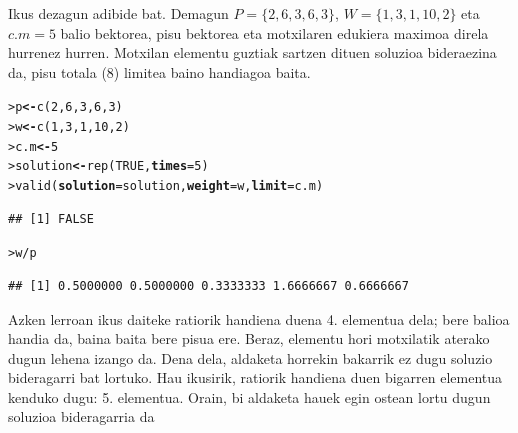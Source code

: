 \documentclass[eu]{ifirak}\usepackage[]{graphicx}\usepackage[]{color}
\makeatletter
\newcommand{\hlnum}[1]{\textcolor[rgb]{0.659,0.4,0.051}{#1}}%
\newcommand{\hlopt}[1]{\textcolor[rgb]{0,0,0}{#1}}%
\newcommand{\hlstd}[1]{\textcolor[rgb]{0,0,0}{#1}}%
\newcommand{\hlkwb}[1]{\textcolor[rgb]{0.549,0.114,0.412}{\textbf{#1}}}%
\newcommand{\hlkwc}[1]{\textcolor[rgb]{0.659,0.573,0.133}{\textbf{#1}}}%
\newcommand{\hlkwd}[1]{\textcolor[rgb]{0.659,0.133,0.482}{#1}}%
\newenvironment{kframe}{%
 \def\at@end@of@kframe{}%
 \ifinner\ifhmode%
  \def\at@end@of@kframe{\end{minipage}}%
  \begin{minipage}{\columnwidth}%
 \fi\fi%
 \def\FrameCommand##1{\hskip\@totalleftmargin \hskip-\fboxsep
 \colorbox{shadecolor}{##1}\hskip-\fboxsep
     \hskip-\linewidth \hskip-\@totalleftmargin \hskip\columnwidth}%
 \MakeFramed {\advance\hsize-\width
   \@totalleftmargin\z@ \linewidth\hsize
   \@setminipage}}%
 {\par\unskip\endMakeFramed%
 \at@end@of@kframe}
\newenvironment{knitrout}{}{} %
\makeatother
\begin{document}
Ikus dezagun adibide bat. Demagun $P=\{2,6,3,6,3\}$, $W=\{1,3,1,10,2\}$ eta $c.m = 5$ balio bektorea, pisu bektorea eta motxilaren edukiera maximoa direla hurrenez hurren. Motxilan elementu guztiak sartzen dituen soluzioa bideraezina da, pisu totala (8) limitea baino handiagoa baita.

\begin{knitrout}
\color{fgcolor}\begin{kframe}
\begin{alltt}
\hlstd{> }\hlstd{p} \hlkwb{<-} \hlkwd{c}\hlstd{(}\hlnum{2}\hlstd{,} \hlnum{6}\hlstd{,} \hlnum{3}\hlstd{,} \hlnum{6}\hlstd{,} \hlnum{3}\hlstd{)}
\hlstd{> }\hlstd{w} \hlkwb{<-} \hlkwd{c}\hlstd{(}\hlnum{1}\hlstd{,} \hlnum{3}\hlstd{,} \hlnum{1}\hlstd{,} \hlnum{10}\hlstd{,} \hlnum{2}\hlstd{)}
\hlstd{> }\hlstd{c.m} \hlkwb{<-} \hlnum{5}
\hlstd{> }\hlstd{solution} \hlkwb{<-} \hlkwd{rep}\hlstd{(}\hlnum{TRUE}\hlstd{,} \hlkwc{times}\hlstd{=}\hlnum{5}\hlstd{)}
\hlstd{> }\hlkwd{valid}\hlstd{(}\hlkwc{solution}\hlstd{=solution,} \hlkwc{weight}\hlstd{=w,} \hlkwc{limit}\hlstd{=c.m)}
\end{alltt}
\begin{verbatim}
## [1] FALSE
\end{verbatim}
\begin{alltt}
\hlstd{> }\hlstd{w} \hlopt{/} \hlstd{p}
\end{alltt}
\begin{verbatim}
## [1] 0.5000000 0.5000000 0.3333333 1.6666667 0.6666667
\end{verbatim}
\end{kframe}
\end{knitrout}

Azken lerroan ikus daiteke ratiorik handiena duena 4. elementua dela; bere balioa handia da, baina baita bere pisua ere. Beraz, elementu hori motxilatik aterako dugun lehena izango da. Dena dela, aldaketa horrekin bakarrik ez dugu soluzio bideragarri bat lortuko. Hau ikusirik, ratiorik handiena duen bigarren elementua kenduko dugu: 5. elementua. Orain, bi aldaketa hauek egin ostean lortu dugun soluzioa bideragarria da
\end{document}

